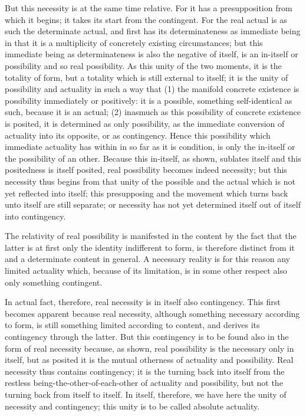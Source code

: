 But this necessity is at the same time relative.
For it has a presupposition from which it begins;
it takes its start from the contingent.
For the real actual is as such the determinate actual,
and first has its determinateness as immediate being
in that it is a multiplicity of concretely existing circumstances;
but this immediate being as determinateness is also the negative of
itself, is an in-itself or possibility and so real possibility.
As this unity of the two moments, it is the totality of form,
but a totality which is still external to itself;
it is the unity of possibility and actuality in such a way that
(1) the manifold concrete existence is possibility immediately or positively:
it is a possible, something self-identical as such, because it is an actual;
(2) inasmuch as this possibility of concrete existence is posited,
it is determined as only possibility,
as the immediate conversion of actuality into its opposite, or as contingency.
Hence this possibility which immediate actuality has within
in so far as it is condition, is only the in-itself
or the possibility of an other.
Because this in-itself, as shown, sublates itself and this positedness
is itself posited, real possibility becomes indeed necessity;
but this necessity thus begins from that unity of the possible and the actual
which is not yet reflected into itself;
this presupposing and the movement which turns back
unto itself are still separate;
or necessity has not yet determined itself
out of itself into contingency.

The relativity of real possibility is manifested in the content
by the fact that the latter is at first only
the identity indifferent to form,
is therefore distinct from it
and a determinate content in general.
A necessary reality is for this reason any limited actuality
which, because of its limitation, is in some other respect
also only something contingent.

In actual fact, therefore, real necessity is in itself also contingency.
This first becomes apparent because real necessity,
although something necessary according to form,
is still something limited according to content,
and derives its contingency through the latter.
But this contingency is to be found also
in the form of real necessity because, as shown,
real possibility is the necessary only in itself,
but as posited it is the mutual otherness of
actuality and possibility.
Real necessity thus contains contingency;
it is the turning back into itself from the restless
being-the-other-of-each-other of actuality and possibility,
but not the turning back from itself to itself.
In itself, therefore, we have here the unity
of necessity and contingency;
this unity is to be called absolute actuality.

